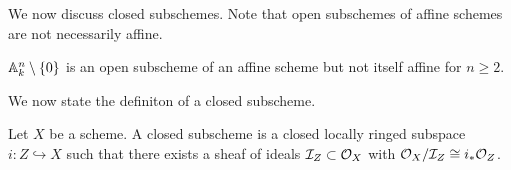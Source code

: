 We now discuss closed subschemes. Note that open subschemes of affine schemes are not necessarily affine. 
\begin{example}
    $\mathbb{A}^{n}_{k}\setminus\{0\}$ is an open subscheme of an affine scheme but not itself affine for $n\geq2$. 
\end{example}
We now state the definiton of a closed subscheme. 
\begin{definition}\label{def: closed subscheme}
    Let $X$ be a scheme. A closed subscheme is a closed locally ringed subspace $i:Z\hookrightarrow X$ such that there exists a sheaf of ideals $\mathcal{I}_{Z}\subset\mathcal{O}_{X}$ with $\mathcal{O}_{X}/\mathcal{I}_{Z}\cong i_{*}\mathcal{O}_{Z}$. 
\end{definition}